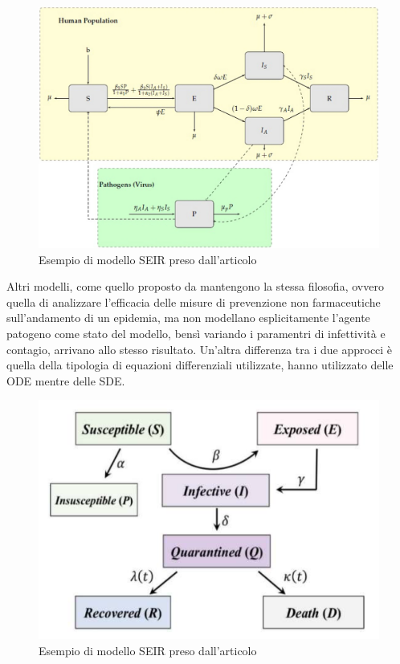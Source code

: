 \begin{figure}[h]
    \includegraphics[width=\linewidth]{img/13104_2020_5192_Fig1_HTML.png}
    \caption{Esempio di modello SEIR preso dall'articolo \cite{Mwalili2020}}
    \label{fig:SEIR_model_social_distancing}
\end{figure}

Altri modelli, come quello proposto da \cite{ijerph17103535} mantengono 
la stessa filosofia, ovvero quella di analizzare l'efficacia delle misure 
di prevenzione non farmaceutiche sull'andamento di un epidemia, ma non
modellano esplicitamente l'agente patogeno come stato del modello, bensì
variando i paramentri di infettività e contagio, arrivano allo stesso 
risultato. Un'altra differenza tra i due approcci è quella della tipologia
di equazioni differenziali utilizzate, \cite{Mwalili2020} hanno utilizzato 
delle ODE mentre \cite{ijerph17103535} delle SDE.

\newpage

\begin{figure}[h]
    \includegraphics[width=\linewidth]{img/ijerph-17-03535-g001.png}
    \caption{Esempio di modello SEIR preso dall'articolo \cite{ijerph17103535}}
    \label{fig:SEIR_model}
\end{figure}

